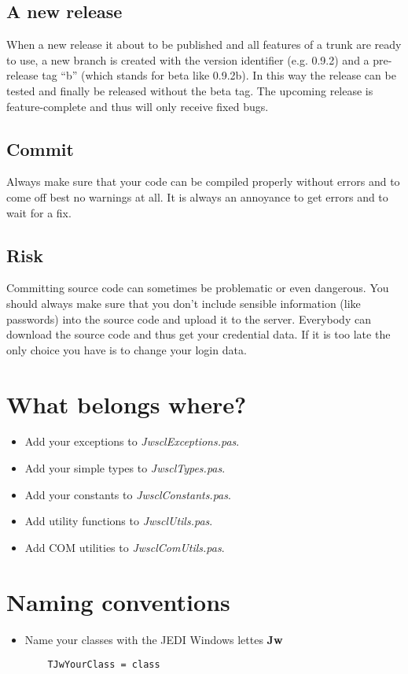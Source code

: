 \documentclass[a4paper,twoside,10pt]{report}
\begin{document}
\subsection{A new release}
When a new release it about to be published and all features of a trunk are ready to use, a new branch is created with the version identifier (e.g. 0.9.2) and a pre-release tag "`b"' (which stands for beta like 0.9.2b). In this way the release can be tested and finally be released without the beta tag. The upcoming release is feature-complete and thus will only receive fixed bugs.

\subsection{Commit}
Always make sure that your code can be compiled properly without errors and to come off best no warnings at all. It is always an annoyance to get errors and to wait for a fix.

\subsection{Risk}
Committing source code can sometimes be problematic or even dangerous. You should always make sure that you don't include sensible information (like passwords) into the source code and upload it to the server. Everybody can download the source code and thus get your credential data. If it is too late the only choice you have is to change your login data.

\section{What belongs where?}\label{Whatbelongswhere}
\begin{itemize}
	\item Add your exceptions to \textit{JwsclExceptions.pas}.
  \item Add your simple types to \textit{JwsclTypes.pas}.
  \item Add your constants to \textit{JwsclConstants.pas}.
  \item Add utility functions to \textit{JwsclUtils.pas}.
  \item Add COM utilities to \textit{JwsclComUtils.pas}.
\end{itemize}

\section{Naming conventions}
\begin{itemize}
	\item Name your classes with the JEDI Windows lettes \textbf{Jw} 
	\begin{lstlisting}
	TJwYourClass = class
	\end{lstlisting} 
\end{itemize}
\end{document}
